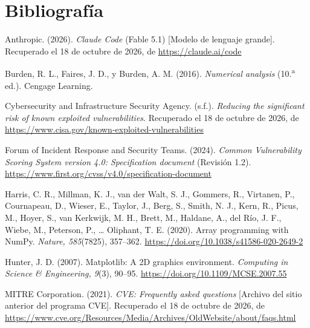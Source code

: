 \section{Bibliografía}
\begin{list}{}{%
  \setlength{\leftmargin}{1.27cm}%
  \setlength{\itemindent}{-1.27cm}%
  \setlength{\labelwidth}{0pt}%
  \setlength{\labelsep}{0pt}%
  \setlength{\itemsep}{0.6em}%
  \setlength{\parsep}{0pt}%
}
  \item[] Anthropic. (2026). \textit{Claude Code} (Fable 5.1) [Modelo de lenguaje grande]. Recuperado el 18 de octubre de 2026, de \url{https://claude.ai/code}

  \item[] Burden, R. L., Faires, J. D., y Burden, A. M. (2016). \textit{Numerical analysis} (10.\textsuperscript{a} ed.). Cengage Learning.

  \item[] Cybersecurity and Infrastructure Security Agency. (s.f.). \textit{Reducing the significant risk of known exploited vulnerabilities}. Recuperado el 18 de octubre de 2026, de \url{https://www.cisa.gov/known-exploited-vulnerabilities}

  \item[] Forum of Incident Response and Security Teams. (2024). \textit{Common Vulnerability Scoring System version 4.0: Specification document} (Revisión 1.2). \url{https://www.first.org/cvss/v4.0/specification-document}

  \item[] Harris, C. R., Millman, K. J., van der Walt, S. J., Gommers, R., Virtanen, P., Cournapeau, D., Wieser, E., Taylor, J., Berg, S., Smith, N. J., Kern, R., Picus, M., Hoyer, S., van Kerkwijk, M. H., Brett, M., Haldane, A., del Río, J. F., Wiebe, M., Peterson, P., \ldots{} Oliphant, T. E. (2020). Array programming with NumPy. \textit{Nature, 585}(7825), 357--362. \url{https://doi.org/10.1038/s41586-020-2649-2}

  \item[] Hunter, J. D. (2007). Matplotlib: A 2D graphics environment. \textit{Computing in Science \& Engineering, 9}(3), 90--95. \url{https://doi.org/10.1109/MCSE.2007.55}

  \item[] MITRE Corporation. (2021). \textit{CVE: Frequently asked questions} [Archivo del sitio anterior del programa CVE]. Recuperado el 18 de octubre de 2026, de \url{https://www.cve.org/Resources/Media/Archives/OldWebsite/about/faqs.html}


\end{list}
